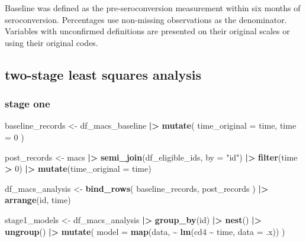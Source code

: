\documentclass[
]{article}
\newenvironment{Shaded}{\begin{snugshade}}{\end{snugshade}}
\newcommand{\AttributeTok}[1]{\textcolor[rgb]{0.13,0.29,0.53}{#1}}
\newcommand{\DecValTok}[1]{\textcolor[rgb]{0.00,0.00,0.81}{#1}}
\newcommand{\FunctionTok}[1]{\textcolor[rgb]{0.13,0.29,0.53}{\textbf{#1}}}
\newcommand{\NormalTok}[1]{#1}
\newcommand{\OtherTok}[1]{\textcolor[rgb]{0.56,0.35,0.01}{#1}}
\newcommand{\SpecialCharTok}[1]{\textcolor[rgb]{0.81,0.36,0.00}{\textbf{#1}}}
\newcommand{\StringTok}[1]{\textcolor[rgb]{0.31,0.60,0.02}{#1}}
\begin{document}
Baseline was defined as the pre-seroconversion measurement within six
months of seroconversion. Percentages use non-missing observations as
the denominator. Variables with unconfirmed definitions are presented on
their original scales or using their original codes.

\subsection{two-stage least squares
analysis}\label{two-stage-least-squares-analysis}

\subsubsection{stage one}\label{stage-one}

\begin{Shaded}
\begin{Highlighting}[]
\NormalTok{baseline\_records }\OtherTok{\textless{}{-}}\NormalTok{ df\_macs\_baseline }\SpecialCharTok{|\textgreater{}}
  \FunctionTok{mutate}\NormalTok{(}
    \AttributeTok{time\_original =}\NormalTok{ time,}
    \AttributeTok{time =} \DecValTok{0}
\NormalTok{  )}

\NormalTok{post\_records }\OtherTok{\textless{}{-}}\NormalTok{ macs }\SpecialCharTok{|\textgreater{}}
  \FunctionTok{semi\_join}\NormalTok{(df\_eligible\_ids, }\AttributeTok{by =} \StringTok{"id"}\NormalTok{) }\SpecialCharTok{|\textgreater{}}
  \FunctionTok{filter}\NormalTok{(time }\SpecialCharTok{\textgreater{}} \DecValTok{0}\NormalTok{) }\SpecialCharTok{|\textgreater{}}
  \FunctionTok{mutate}\NormalTok{(}\AttributeTok{time\_original =}\NormalTok{ time)}


\NormalTok{df\_macs\_analysis }\OtherTok{\textless{}{-}} \FunctionTok{bind\_rows}\NormalTok{(}
\NormalTok{  baseline\_records,}
\NormalTok{  post\_records}
\NormalTok{) }\SpecialCharTok{|\textgreater{}}
  \FunctionTok{arrange}\NormalTok{(id, time)}
\end{Highlighting}
\end{Shaded}

\begin{Shaded}
\begin{Highlighting}[]
\NormalTok{stage1\_models }\OtherTok{\textless{}{-}}\NormalTok{ df\_macs\_analysis }\SpecialCharTok{|\textgreater{}}
  \FunctionTok{group\_by}\NormalTok{(id) }\SpecialCharTok{|\textgreater{}}
  \FunctionTok{nest}\NormalTok{() }\SpecialCharTok{|\textgreater{}}
  \FunctionTok{ungroup}\NormalTok{() }\SpecialCharTok{|\textgreater{}}
  \FunctionTok{mutate}\NormalTok{(}
    \AttributeTok{model =} \FunctionTok{map}\NormalTok{(data, }\SpecialCharTok{\textasciitilde{}} \FunctionTok{lm}\NormalTok{(cd4 }\SpecialCharTok{\textasciitilde{}}\NormalTok{ time, }\AttributeTok{data =}\NormalTok{ .x))}
\NormalTok{  )}
\end{Highlighting}
\end{Shaded}
\end{document}
